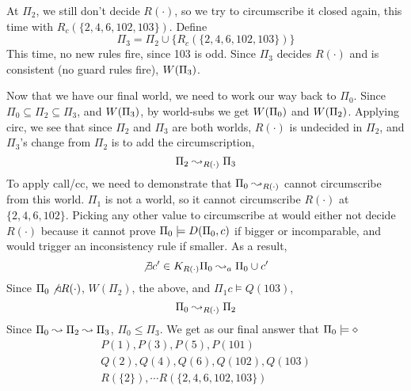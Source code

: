 At $\Pi_2$, we still don't decide $R(\cdot)$, so we try to circumscribe it closed again, this time with $R_c(\{2, 4, 6, 102, 103\})$.
Define
\[
	\Pi_3 = \Pi_2 \cup \{R_c(\{2, 4, 6, 102, 103\})\}
\]
This time, no new rules fire, since 103 is odd.
Since $\Pi_3$ decides $R(\cdot)$ and is consistent (no guard rules fire), $W({\Pi_3})$.

Now that we have our final world, we need to work our way back to $\Pi_0$.
Since $\Pi_0 \subseteq \Pi_2 \subseteq \Pi_3$, and $W({\Pi_3})$, by world-subs we get $W({\Pi_0})$ and $W({\Pi_2})$.
Applying circ, we see that since $\Pi_2$ and $\Pi_3$ are both worlds, $R(\cdot)$ is undecided in $\Pi_2$, and $\Pi_3$'s change from $\Pi_2$ is to add the circumscription,
\[
	\Pi_2 \leadsto_{R(\cdot)} \Pi_3
\]
To apply call/cc, we need to demonstrate that $\Pi_0 \leadsto_{R(\cdot)}$ cannot circumscribe from this world.
$\Pi_1$ is not a world, so it cannot circumscribe $R(\cdot)$ at $\{2, 4, 6, 102\}$.
Picking any other value to circumscribe at would either not decide $R(\cdot)$ because it cannot prove $\Pi_0 \models D(\Pi_0, c)$ if bigger or incomparable, and would trigger an inconsistency rule if smaller.
As a result,
\[
	\not \exists c' \in K_{R(\cdot)} \Pi_0 \leadsto_a \Pi_0 \cup c'
\]
Since $\Pi_0 \not \triangleleft R(\cdot)$, $W(\Pi_2)$, the above, and $\Pi_1c \models Q(103)$,
\[
	\Pi_0 \leadsto_{R(\cdot)} \Pi_2
\]
Since $\Pi_0 \leadsto \Pi_2 \leadsto \Pi_3$, $\Pi_0 \leq \Pi_3$.
We get as our final answer that $\Pi_0 \models \diamond$
\begin{align*}
	P(1), P(3), P(5), P(101)\\
	Q(2), Q(4), Q(6), Q(102), Q(103)\\
	R(\{2\}), \cdots R(\{2, 4, 6, 102, 103\})\\
\end{align*}
